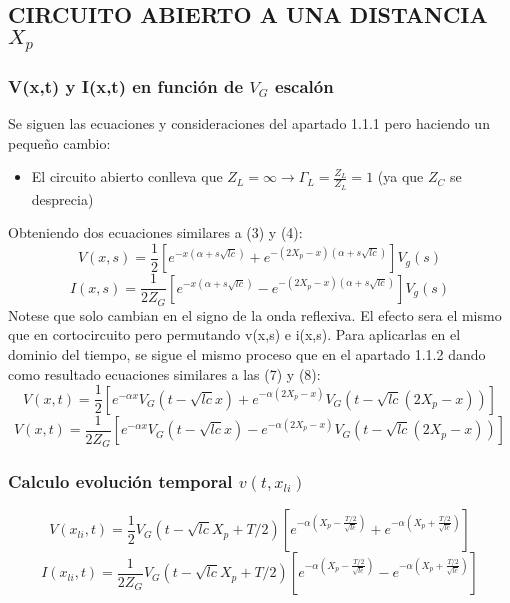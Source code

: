 \documentclass[12pt]{article}
\begin{document}
\subsection{CIRCUITO ABIERTO A UNA DISTANCIA $X_{p}$}
\subsubsection{V(x,t) y I(x,t) en función de ${V}_{G}$ escalón}
Se siguen las ecuaciones y consideraciones del apartado 1.1.1 pero haciendo un pequeño cambio:
\begin{itemize}
	\item El circuito abierto conlleva que ${Z}_{L} = \infty \rightarrow {\Gamma}_{L}=\frac{{Z}_{L}}{{Z}_{L}}=1$ (ya que ${Z}_{C}$ se desprecia)
\end{itemize}
Obteniendo dos ecuaciones similares a (3) y (4):
\begin{equation}
V(x,s)= \frac{1}{2}[{e}^{-x(\alpha + s\sqrt{lc})} + {e}^{-(2{X}_{p}-x)(\alpha + s\sqrt{lc})}]{V}_{g}(s)
\end{equation}
\begin{equation}
I(x,s)= \frac{1}{2{Z}_{G}}[{e}^{-x(\alpha + s\sqrt{lc})} - {e}^{-(2{X}_{p}-x)(\alpha + s\sqrt{lc})}]{V}_{g}(s)
\end{equation}
Notese que solo cambian en el signo de la onda reflexiva. El efecto sera el mismo que en cortocircuito pero permutando v(x,s) e i(x,s).
Para aplicarlas en el dominio del tiempo, se sigue el mismo proceso que en el apartado 1.1.2 dando como resultado ecuaciones similares a las (7) y (8):
\begin{equation}
V(x,t)= \frac{1}{2}[{e}^{-\alpha x}{V}_{G}(t-\sqrt{lc}x) + {e}^{-\alpha(2{X}_{p}-x)} {V}_{G}(t-\sqrt{lc}(2{X}_{p}-x))]
\end{equation}
\begin{equation}
V(x,t)= \frac{1}{2{Z}_{G}}[{e}^{-\alpha x}{V}_{G}(t-\sqrt{lc}x) - {e}^{-\alpha(2{X}_{p}-x)} {V}_{G}(t-\sqrt{lc}(2{X}_{p}-x))]
\end{equation}

\subsubsection{Calculo evolución temporal $v(t,{x}_{li})$}
\begin{displaymath}
V({x}_{li},t) = \frac{1}{2}{V}_{G}(t-\sqrt{lc}{X}_{p} + {T/2})[{e}^{-\alpha ({X}_{p}- \frac{T/2}{\sqrt{lc}})} + {e}^{-\alpha({X}_{p} + \frac{T/2}{\sqrt{lc}})}]
\end{displaymath}
\begin{displaymath}
I({x}_{li},t) = \frac{1}{2{Z}_{G}}{V}_{G}(t-\sqrt{lc}{X}_{p} + {T/2})[{e}^{-\alpha ({X}_{p}- \frac{T/2}{\sqrt{lc}})} - {e}^{-\alpha({X}_{p} + \frac{T/2}{\sqrt{lc}})}]
\end{displaymath}
\end{document}
